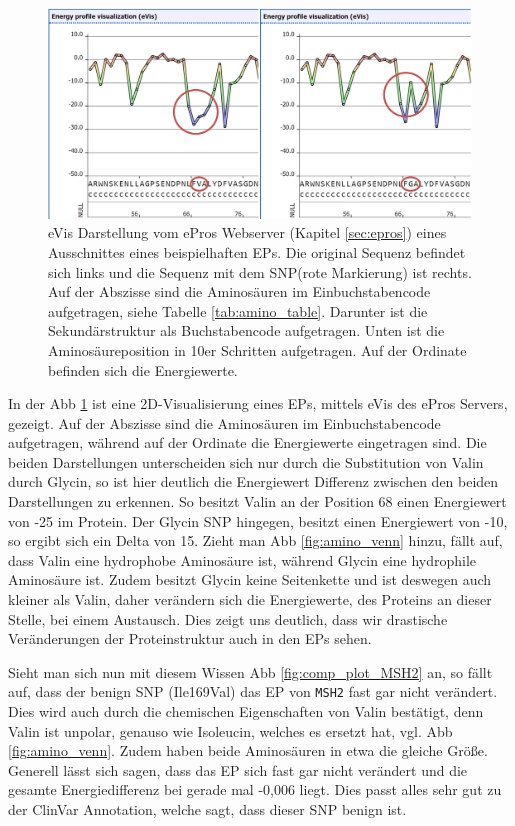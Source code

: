 \begin{figure}
    \centering
    \includegraphics[width=.99\textwidth]{images/ep_vs_snp.png}
    \caption{\ac{eVis} Darstellung vom ePros Webserver (Kapitel \ref{sec:epros}) eines Ausschnittes eines beispielhaften \ac{EP}s. Die original Sequenz befindet sich links und die Sequenz mit dem \ac{SNP}(rote Markierung) ist rechts. Auf der Abszisse sind die Aminosäuren im Einbuchstabencode aufgetragen, siehe Tabelle \ref{tab:amino_table}. Darunter ist die Sekundärstruktur als Buchstabencode aufgetragen. Unten ist die Aminosäureposition in 10er Schritten aufgetragen. Auf der Ordinate befinden sich die Energiewerte.}
    \label{fig:ep_vs_snp}
\end{figure}

In der \ac{Abb} \ref{fig:ep_vs_snp} ist eine 2D-Visualisierung eines \ac{EP}s, mittels eVis des ePros Servers, gezeigt. Auf der Abszisse sind die Aminosäuren im Einbuchstabencode aufgetragen, während auf der Ordinate die Energiewerte eingetragen sind. Die beiden Darstellungen unterscheiden sich nur durch die Substitution von Valin durch Glycin, so ist hier deutlich die Energiewert Differenz zwischen den beiden Darstellungen zu erkennen. So besitzt Valin an der Position 68 einen Energiewert von -25 im Protein. Der Glycin \ac{SNP} hingegen, besitzt einen Energiewert von -10, so ergibt sich ein Delta von 15. Zieht man \ac{Abb} \ref{fig:amino_venn} hinzu, fällt auf, dass Valin eine hydrophobe Aminosäure ist, während Glycin eine hydrophile Aminosäure ist. Zudem besitzt Glycin keine Seitenkette und ist deswegen auch kleiner als Valin, daher verändern sich die Energiewerte, des Proteins an dieser Stelle, bei einem Austausch. Dies zeigt uns deutlich, dass wir drastische Veränderungen der Proteinstruktur auch in den \ac{EP}s sehen.

Sieht man sich nun mit diesem Wissen \ac{Abb} \ref{fig:comp_plot_MSH2} an, so fällt auf, dass der benign \ac{SNP} (Ile169Val) das \ac{EP} von \texttt{MSH2} fast gar nicht verändert. Dies wird auch durch die chemischen Eigenschaften von Valin bestätigt, denn Valin ist unpolar, genauso wie Isoleucin, welches es ersetzt hat, vgl. \ac{Abb} \ref{fig:amino_venn}. Zudem haben beide Aminosäuren in etwa die gleiche Größe. Generell lässt sich sagen, dass das \ac{EP} sich fast gar nicht verändert und die gesamte Energiedifferenz bei gerade mal -0,006 liegt. Dies passt alles sehr gut zu der ClinVar Annotation, welche sagt, dass dieser \ac{SNP} benign ist.

